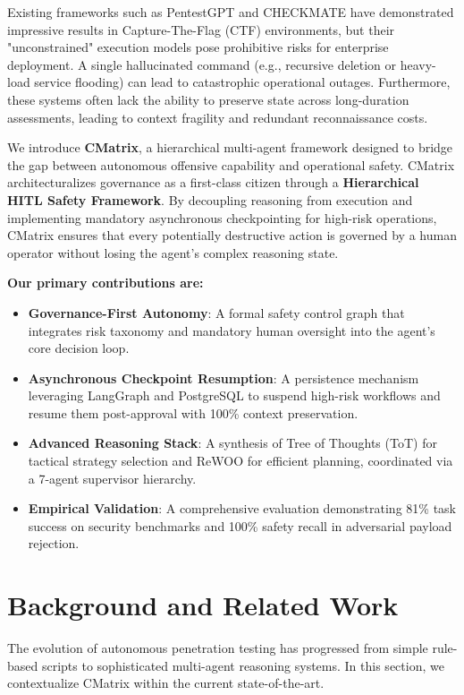 \documentclass[conference]{IEEEtran}
\begin{document}
Existing frameworks such as PentestGPT \cite{pentestgpt} and CHECKMATE \cite{checkmate2025} have demonstrated impressive results in Capture-The-Flag (CTF) environments, but their "unconstrained" execution models pose prohibitive risks for enterprise deployment. A single hallucinated command (e.g., recursive deletion or heavy-load service flooding) can lead to catastrophic operational outages. Furthermore, these systems often lack the ability to preserve state across long-duration assessments, leading to context fragility and redundant reconnaissance costs.

We introduce \textbf{CMatrix}, a hierarchical multi-agent framework designed to bridge the gap between autonomous offensive capability and operational safety. CMatrix architecturalizes governance as a first-class citizen through a \textbf{Hierarchical HITL Safety Framework}. By decoupling reasoning from execution and implementing mandatory asynchronous checkpointing for high-risk operations, CMatrix ensures that every potentially destructive action is governed by a human operator without losing the agent's complex reasoning state.

\textbf{Our primary contributions are:}
\begin{itemize}
    \item \textbf{Governance-First Autonomy}: A formal safety control graph that integrates risk taxonomy and mandatory human oversight into the agent's core decision loop.
    \item \textbf{Asynchronous Checkpoint Resumption}: A persistence mechanism leveraging LangGraph and PostgreSQL to suspend high-risk workflows and resume them post-approval with 100\% context preservation.
    \item \textbf{Advanced Reasoning Stack}: A synthesis of Tree of Thoughts (ToT) for tactical strategy selection and ReWOO for efficient planning, coordinated via a 7-agent supervisor hierarchy.
    \item \textbf{Empirical Validation}: A comprehensive evaluation demonstrating 81\% task success on security benchmarks and 100\% safety recall in adversarial payload rejection.
\end{itemize}

\section{Background and Related Work}
\label{sec:background}

The evolution of autonomous penetration testing has progressed from simple rule-based scripts to sophisticated multi-agent reasoning systems. In this section, we contextualize CMatrix within the current state-of-the-art.
\end{document}
